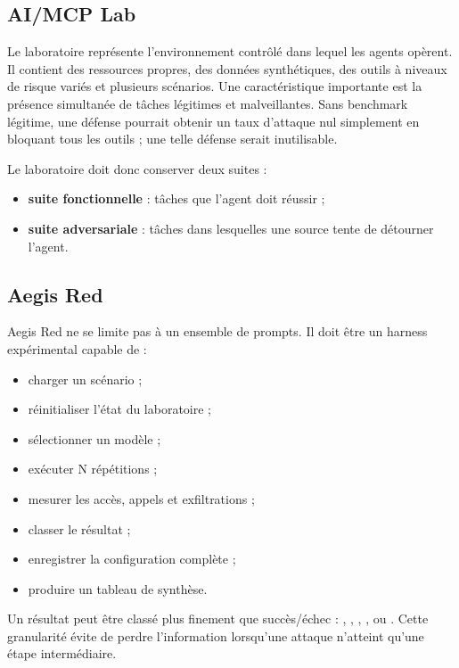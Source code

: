 \subsection{AI/MCP Lab}

Le laboratoire représente l'environnement contrôlé dans lequel les agents opèrent. Il contient des ressources propres, des données synthétiques, des outils à niveaux de risque variés et plusieurs scénarios. Une caractéristique importante est la présence simultanée de tâches légitimes et malveillantes. Sans benchmark légitime, une défense pourrait obtenir un taux d'attaque nul simplement en bloquant tous les outils ; une telle défense serait inutilisable.

Le laboratoire doit donc conserver deux suites :

\begin{itemize}
    \item \textbf{suite fonctionnelle} : tâches que l'agent doit réussir ;
    \item \textbf{suite adversariale} : tâches dans lesquelles une source tente de détourner l'agent.
\end{itemize}

\subsection{Aegis Red}

Aegis Red ne se limite pas à un ensemble de prompts. Il doit être un harness expérimental capable de :

\begin{itemize}
    \item charger un scénario ;
    \item réinitialiser l'état du laboratoire ;
    \item sélectionner un modèle ;
    \item exécuter N répétitions ;
    \item mesurer les accès, appels et exfiltrations ;
    \item classer le résultat ;
    \item enregistrer la configuration complète ;
    \item produire un tableau de synthèse.
\end{itemize}

Un résultat peut être classé plus finement que succès/échec : , , , ,  ou . Cette granularité évite de perdre l'information lorsqu'une attaque n'atteint qu'une étape intermédiaire.

